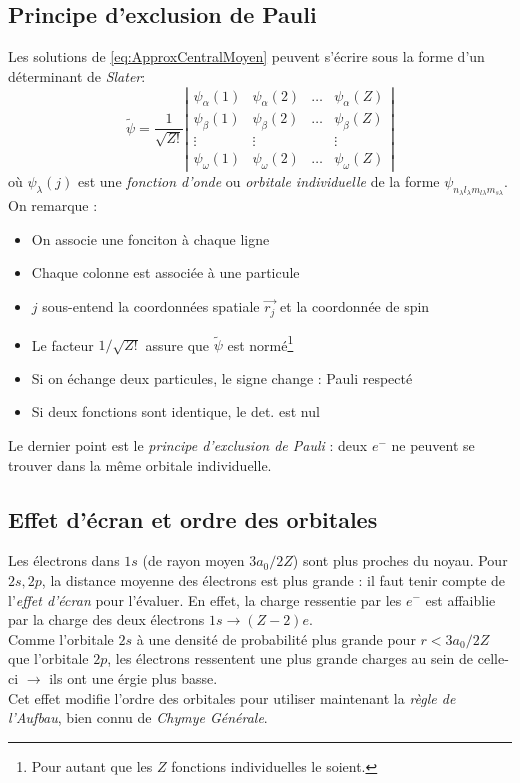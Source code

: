 \documentclass	[11pt, a4paper, openany]{book}
\begin{document}
	\subsection{Principe d'exclusion de Pauli}
	Les solutions de \autoref{eq:ApproxCentralMoyen} peuvent s'écrire sous la forme d'un
	déterminant de \textit{Slater}:
	\begin{equation}
	\tilde{\psi} = \frac{1}{\sqrt{Z!}}\left|\begin{array}{cccc}
	\psi_\alpha(1) & \psi_\alpha(2) & \dots & \psi_\alpha(Z)\\
	\psi_\beta(1) & \psi_\beta(2) & \dots & \psi_\beta(Z)\\
	\vdots & \vdots & & \vdots\\
	\psi_\omega(1) & \psi_\omega(2) & \dots & \psi_\omega(Z)
	\end{array}\right|
	\end{equation}
	où $\psi_\lambda(j)$ est une \textit{fonction d'onde} ou \textit{orbitale individuelle}
	de la forme $\psi_{n_\lambda l_\lambda m_{l\lambda}m_{s\lambda}}$. On remarque :
	\begin{itemize}
	\item On associe une fonciton à chaque ligne
	\item Chaque colonne est associée à une particule
	\item $j$ sous-entend la coordonnées spatiale $\vec{r_j}$ et la coordonnée de spin
	\item Le facteur $1/\sqrt{Z!}$ assure que $\tilde{\psi}$ est normé\footnote{Pour autant 
	que les $Z$ fonctions individuelles le soient.}
	\item Si on échange deux particules, le signe change : Pauli respecté
	\item Si deux fonctions sont identique, le det. est nul
	\end{itemize}
	Le dernier point est le \textit{principe d'exclusion de Pauli} : deux $e^-$ ne peuvent 
	se trouver dans la même orbitale individuelle.
	
	\subsection{Effet d'écran et ordre des orbitales}
	Les électrons dans $1s$ (de rayon moyen $3a_0/2Z$) sont plus proches du noyau. Pour 
	$2s,2p$, la distance moyenne des électrons est plus grande : il faut tenir compte de 
	l'\textit{effet d'écran} pour l'évaluer. En effet, la charge ressentie par les $e^-$ 
	est affaiblie par la charge des deux électrons $1s \rightarrow (Z-2)e$.\\
	Comme l'orbitale $2s$ à une densité de probabilité plus grande pour $r<3a_0/2Z$ que 
	l'orbitale $2p$, les électrons ressentent une plus grande charges au sein de celle-ci
	$\rightarrow$ ils ont une érgie plus basse.\\
	Cet effet modifie l'ordre des orbitales pour utiliser maintenant la \textit{règle de 
	l'Aufbau}, bien connu de \textit{Chymye Générale}.\\
	
\end{document}
